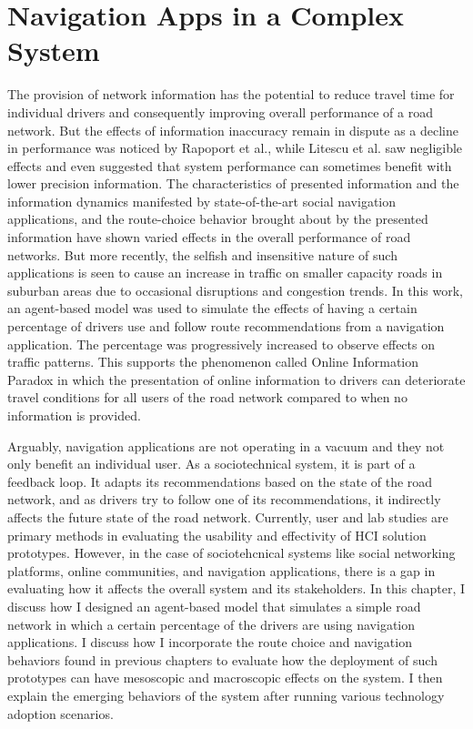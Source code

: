 \chapter{Navigation Apps in a Complex System}
The provision of network information has the potential to reduce travel time for individual drivers and consequently improving overall performance of a road network\cite{Chorus2006TravelReview}. But the effects of information inaccuracy remain in dispute as a decline in performance was noticed by Rapoport et al.\cite{Rapoport2014Pre-tripExperiment}, while Litescu et al.\cite{Litescu2016TheSystems} saw negligible effects and even suggested that system performance can sometimes benefit with lower precision information. The characteristics of presented information and the information dynamics manifested by state-of-the-art social navigation applications, and the route-choice behavior brought about by the presented information have shown varied effects in the overall performance of road networks. But more recently, the selfish and insensitive nature of such applications is seen to cause an increase in traffic on smaller capacity roads in suburban areas due to occasional disruptions and congestion trends\cite{Cabannes2018TheApproach}. In this work, an agent-based model was used to simulate the effects of having a certain percentage of drivers use and follow route recommendations from a navigation application. The percentage was progressively increased to observe effects on traffic patterns. This supports the phenomenon called Online Information Paradox\cite{Wijayaratna2017DoesParadox} in which the presentation of online information to drivers can deteriorate travel conditions for all users of the road network compared to when no information is provided. 

Arguably, navigation applications are not operating in a vacuum and they not only benefit an individual user. As a sociotechnical system, it is part of a feedback loop. It adapts its recommendations based on the state of the road network, and as drivers try to follow one of its recommendations, it indirectly affects the future state of the road network. Currently, user and lab studies are primary methods in evaluating the usability and effectivity of HCI solution prototypes. However, in the case of sociotehcnical systems like social networking platforms, online communities, and navigation applications, there is a gap in evaluating how it affects the overall system and its stakeholders. In this chapter, I discuss how I designed an agent-based model that simulates a simple road network in which a certain percentage of the drivers are using navigation applications. I discuss how I incorporate the route choice and navigation behaviors found in previous chapters to evaluate how the deployment of such prototypes can have mesoscopic and macroscopic effects on the system. I then explain the emerging behaviors of the system after running various technology adoption scenarios.

